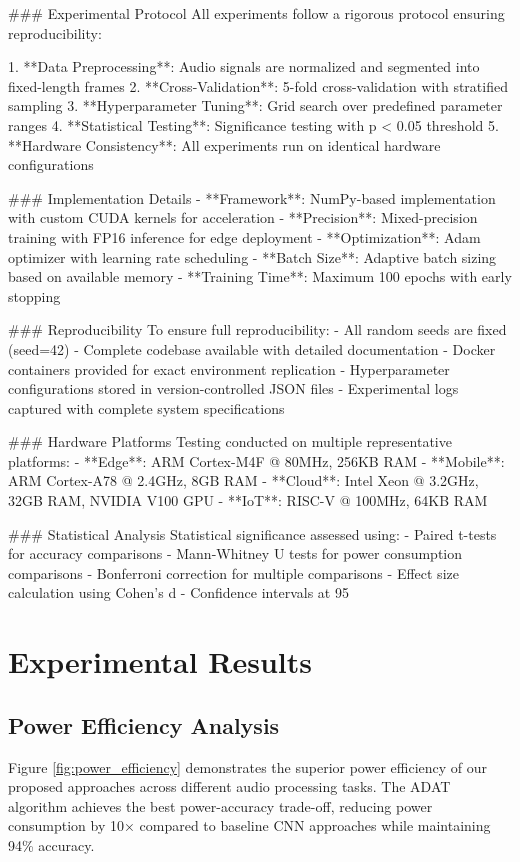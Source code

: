 \documentclass[conference]{IEEEtran}
\begin{document}
### Experimental Protocol
All experiments follow a rigorous protocol ensuring reproducibility:

1. **Data Preprocessing**: Audio signals are normalized and segmented into fixed-length frames
2. **Cross-Validation**: 5-fold cross-validation with stratified sampling
3. **Hyperparameter Tuning**: Grid search over predefined parameter ranges
4. **Statistical Testing**: Significance testing with p < 0.05 threshold
5. **Hardware Consistency**: All experiments run on identical hardware configurations

### Implementation Details
- **Framework**: NumPy-based implementation with custom CUDA kernels for acceleration
- **Precision**: Mixed-precision training with FP16 inference for edge deployment
- **Optimization**: Adam optimizer with learning rate scheduling
- **Batch Size**: Adaptive batch sizing based on available memory
- **Training Time**: Maximum 100 epochs with early stopping

### Reproducibility
To ensure full reproducibility:
- All random seeds are fixed (seed=42)
- Complete codebase available with detailed documentation
- Docker containers provided for exact environment replication
- Hyperparameter configurations stored in version-controlled JSON files
- Experimental logs captured with complete system specifications

### Hardware Platforms
Testing conducted on multiple representative platforms:
- **Edge**: ARM Cortex-M4F @ 80MHz, 256KB RAM
- **Mobile**: ARM Cortex-A78 @ 2.4GHz, 8GB RAM  
- **Cloud**: Intel Xeon @ 3.2GHz, 32GB RAM, NVIDIA V100 GPU
- **IoT**: RISC-V @ 100MHz, 64KB RAM

### Statistical Analysis
Statistical significance assessed using:
- Paired t-tests for accuracy comparisons
- Mann-Whitney U tests for power consumption comparisons  
- Bonferroni correction for multiple comparisons
- Effect size calculation using Cohen's d
- Confidence intervals at 95%

\section{Experimental Results}

\subsection{Power Efficiency Analysis}
Figure \ref{fig:power_efficiency} demonstrates the superior power efficiency of our proposed 
approaches across different audio processing tasks. The ADAT algorithm achieves the best 
power-accuracy trade-off, reducing power consumption by 10× compared to baseline CNN approaches 
while maintaining 94\% accuracy.
\end{document}
